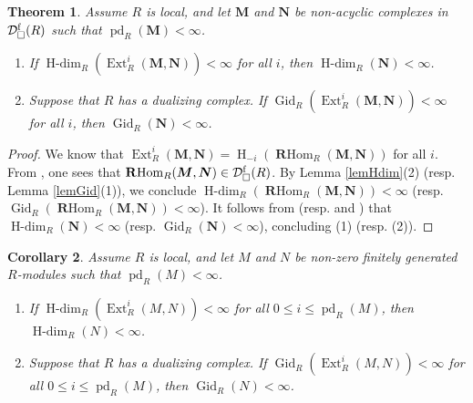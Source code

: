 \documentclass[11pt, a4paper,pagebackref]{amsart}
\numberwithin{equation}{section}
\newtheorem{theorem}{Theorem}[section]
\newtheorem{corollary}[theorem]{Corollary}
\theoremstyle{definition}
\newtheorem{remark and definition}[theorem]{Remark and Definition}
\newtheorem{remark and notation}[theorem]{Remark and Notation}
\newcommand\Ext{\operatorname{Ext}}
\newcommand\RHom{\operatorname{\mathbf{R}Hom}}
\DeclareMathOperator{\Hdim}{H-dim}
\begin{document}
\begin{theorem}\label{GSPA11}
    Assume $R$ is local, and let $\boldsymbol{M}$ and $\boldsymbol{N}$ be non-acyclic complexes in $\mathcal{D}_{\square}^{\rm f}(R)$ such that  $\operatorname{pd}_R(\boldsymbol{M})<\infty$.
    \begin{enumerate}[\rm (1)]
        \item   If $\Hdim_R(\Ext_R^i(\boldsymbol{M}, \boldsymbol{N}))<\infty$  for all $i$, then $\operatorname{H-dim}_R(\boldsymbol{N})<\infty$.
        \item  Suppose that $R$ has a dualizing complex.  If $\operatorname{Gid}_R(\Ext_R^i(\boldsymbol{M}, \boldsymbol{N}))<\infty$ for all $i$, then $\operatorname{Gid}_R(\boldsymbol{N})<\infty$.
    \end{enumerate}
\end{theorem}
\begin{proof}
     We know that $\Ext_R^i(\boldsymbol{M},\boldsymbol{N})=\operatorname{H}_{-i}(\RHom_R(\boldsymbol{M},\boldsymbol{N}))$ for all $i$. From \cite[A.4.4 and A.5.4]{GorensteinDimensions}, one sees that $\RHom_R(\boldsymbol{M},\boldsymbol{N}) \in \mathcal{D}_{\square}^{\rm f}(R)$. By Lemma \ref{lemHdim}(2) (resp.  Lemma \ref{lemGid}(1)), we conclude  $\operatorname{H-dim}_R(\RHom_R(\boldsymbol{M}, \boldsymbol{N}))<\infty$ (resp. \linebreak $\operatorname{Gid}_R(\RHom_R(\boldsymbol{M}, \boldsymbol{N}))<\infty$).  It follows from \cite[Theorems 5.6 \& 5.8]{GdimensionOverLocalHomomorphisms} (resp. \cite[Proposition 4.1(b)]{CompleteIntersectionDimensionsandFoxbyClasses} and \cite[Theorem 4.4]{OnGorensteinProjectiveInjectiveAndFlatDimensionsAFunctorialDescriptionWithApplications})  that $\operatorname{H-dim}_R (\boldsymbol{N})<\infty$ (resp. $\operatorname{Gid}_R (\boldsymbol{N})<\infty$), concluding (1) (resp. (2)). 
    \end{proof}


\begin{corollary} \label{SPA11} 
    Assume $R$ is local, and let $M$ and $N$ be non-zero finitely generated $R$-modules such that $\operatorname{pd}_R(M)<\infty$. 
    \begin{enumerate}[\rm(1)]
        \item If $\operatorname{H-dim}_R(\Ext_R^i(M,N))<\infty$ for all $0\leq i \leq \operatorname{pd}_R(M)$, then $\operatorname{H-dim}_R(N)<\infty$. 
        \item Suppose that $R$ has a dualizing complex. If $\operatorname{Gid}_R(\Ext_R^i(M,N))<\infty$ for all $0\leq i \leq \operatorname{pd}_R(M)$, then $\operatorname{Gid}_R(N)<\infty$. 
    \end{enumerate}
    \end{corollary}
\end{document}
